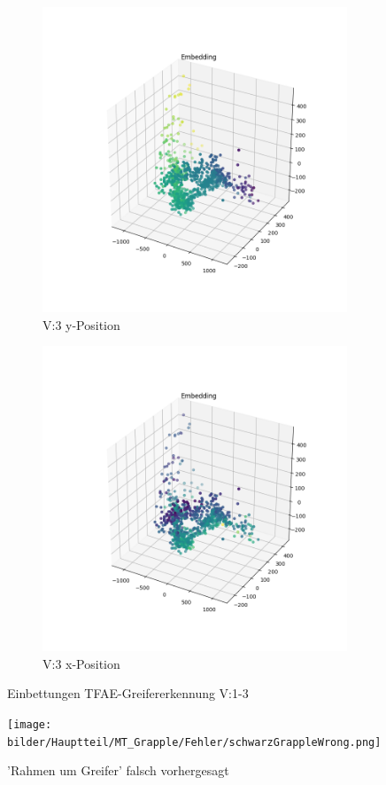 \begin{figure}[h]
	\begin{subfigure}[c]{0.49\textwidth}			
		\includegraphics[width=1\textwidth,center]{bilder/Hauptteil/MT_Grapple/EMB_alle/3_Embedding_y.png}
		\caption{V:3 y-Position}
		\label{img:Einbettung3_y}	
	\end{subfigure}
	\centering
	\begin{subfigure}[c]{0.49\textwidth}			
		\includegraphics[width=1\textwidth,center]{bilder/Hauptteil/MT_Grapple/EMB_alle/3_Embedding_x.png}
		\caption{V:3 x-Position}
		\label{img:Einbettung3_x}		
	\end{subfigure}
	
	\caption{Einbettungen TFAE-Greifererkennung V:1-3}
	\label{img:Einbettungen1-3}
\end{figure}

	\begin{figure}[h]
		\centering
		\texttt{[image: bilder/Hauptteil/MT\_Grapple/Fehler/schwarzGrappleWrong.png]}
		\caption{'Rahmen um Greifer' falsch vorhergesagt}
		\label{img:GrappleFalschVorhergesagt}
	\end{figure}

